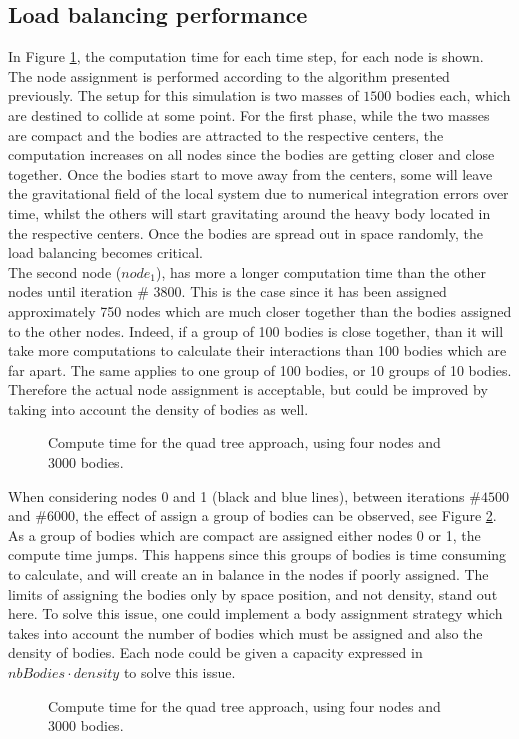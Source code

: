 \subsection{Load balancing performance}
In Figure \ref{fig:computeTimes:allnodes}, the computation time for each time step, for each node is shown. The node assignment is performed according to the algorithm presented previously. The setup for this simulation is two masses of $1500$ bodies each, which are destined to collide at some point. For the first phase, while the two masses are compact and the bodies are attracted to the respective centers, the computation increases on all nodes since the bodies are getting closer and close together. Once the bodies start to move away from the centers, some will leave the gravitational field of the local system due to numerical integration errors over time, whilst the others will start gravitating around the heavy body located in the respective centers. Once the bodies are spread out in space randomly, the load balancing becomes critical.\\
The second node ($node_1$), has more a longer computation time than the other nodes until iteration $\#$ 3800. This is the case since it has been assigned approximately 750 nodes which are much closer together than the bodies assigned to the other nodes. Indeed, if a group of 100 bodies is close together, than it will take more computations to calculate their interactions than 100 bodies which are far apart. The same applies to one group of 100 bodies, or 10 groups of 10 bodies. Therefore the actual node assignment is acceptable, but could be improved by taking into account the density of bodies as well.\\
\begin{figure}[H]
\centering

\caption{Compute time for the quad tree approach, using four nodes and 3000 bodies.}
\label{fig:computeTimes:allnodes}
\end{figure}
\newpage
When considering nodes 0 and 1 (black and blue lines), between iterations $\#4500$ and $\#6000$, the effect of assign a group of bodies can be observed, see Figure \ref{fig:computeTimes2Nodes:zoom}. As a group of bodies which are compact are assigned either nodes 0 or 1, the compute time jumps. This happens since this groups of bodies is time consuming to calculate, and will create an in balance in the nodes if poorly assigned. The limits of assigning the bodies only by space position, and not density, stand out here. To solve this issue, one could implement a body assignment strategy which takes into account the number of bodies which must be assigned and also the density of bodies. Each node could be given a capacity expressed in $nbBodies \cdot density$ to solve this issue.
\begin{figure}[h]
\centering

\caption{Compute time for the quad tree approach, using four nodes and 3000 bodies.}
\label{fig:computeTimes2Nodes:zoom}
\end{figure}
